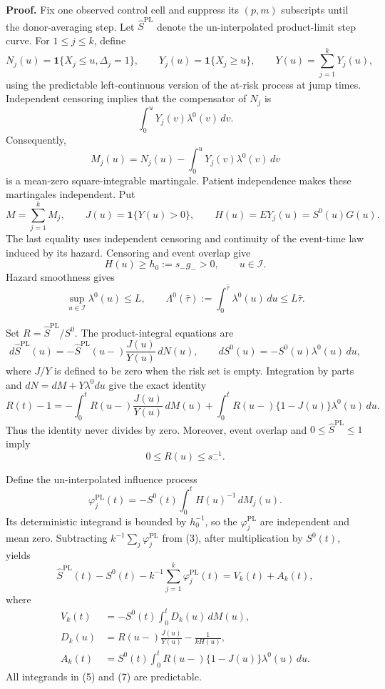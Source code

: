 \textbf{Proof.}
Fix one observed control cell and suppress its \((p,m)\) subscripts until the donor-averaging step.  Let \(\widehat S^{\mathrm{PL}}\) denote the un-interpolated product-limit step curve.  For \(1\le j\le k\), define
\[
 N_j(u)=\mathbf 1\{X_j\le u,\Delta_j=1\},\qquad
 Y_j(u)=\mathbf 1\{X_j\ge u\},\qquad
 Y(u)=\sum_{j=1}^kY_j(u),
\]
using the predictable left-continuous version of the at-risk process at jump times.  Independent censoring implies that the compensator of \(N_j\) is
\[
 \int_0^uY_j(v)\lambda^0(v)\,dv.
\]
Consequently,
\[
 M_j(u)=N_j(u)-\int_0^uY_j(v)\lambda^0(v)\,dv
\]
is a mean-zero square-integrable martingale.  Patient independence makes these martingales independent.  Put
\[
 M=\sum_{j=1}^kM_j,\qquad
 J(u)=\mathbf 1\{Y(u)>0\},\qquad
 H(u)=E Y_j(u)=S^0(u)G(u).
\]
The last equality uses independent censoring and continuity of the event-time law induced by its hazard.  Censoring and event overlap give
\[
 H(u)\ge h_0:=s_-g_->0,
 \qquad u\in\mathcal I.                                      \tag{1}
\]
Hazard smoothness gives
\[
 \sup_{u\in\mathcal I}\lambda^0(u)\le L,
 \qquad
 \Lambda^0(\bar\tau):=\int_0^{\bar\tau}\lambda^0(u)\,du
 \le L\bar\tau.                                               \tag{2}
\]

Set \(R=\widehat S^{\mathrm{PL}}/S^0\).  The product-integral equations are
\[
 d\widehat S^{\mathrm{PL}}(u)
 =-\widehat S^{\mathrm{PL}}(u-)\frac{J(u)}{Y(u)}\,dN(u),
 \qquad
 dS^0(u)=-S^0(u)\lambda^0(u)\,du,
\]
where \(J/Y\) is defined to be zero when the risk set is empty.  Integration by parts and \(dN=dM+Y\lambda^0du\) give the exact identity
\[
 R(t)-1
 =-\int_0^tR(u-)\frac{J(u)}{Y(u)}\,dM(u)
  +\int_0^tR(u-)\{1-J(u)\}\lambda^0(u)\,du.                 \tag{3}
\]
Thus the identity never divides by zero.  Moreover, event overlap and \(0\le\widehat S^{\mathrm{PL}}\le1\) imply
\[
 0\le R(u)\le s_-^{-1}.                                      \tag{4}
\]

Define the un-interpolated influence process
\[
 \varphi_j^{\mathrm{PL}}(t)
 =-S^0(t)\int_0^tH(u)^{-1}\,dM_j(u).                         \tag{5}
\]
Its deterministic integrand is bounded by \(h_0^{-1}\), so the \(\varphi_j^{\mathrm{PL}}\) are independent and mean zero.  Subtracting \(k^{-1}\sum_j\varphi_j^{\mathrm{PL}}\) from (3), after multiplication by \(S^0(t)\), yields
\[
 \widehat S^{\mathrm{PL}}(t)-S^0(t)
 -k^{-1}\sum_{j=1}^k\varphi_j^{\mathrm{PL}}(t)
 =V_k(t)+A_k(t),                                               \tag{6}
\]
where
\[
 \begin{aligned}
 V_k(t)&=-S^0(t)\int_0^tD_k(u)\,dM(u),\\
 D_k(u)&=R(u-)\frac{J(u)}{Y(u)}-\frac{1}{kH(u)},\\
 A_k(t)&=S^0(t)\int_0^tR(u-)\{1-J(u)\}\lambda^0(u)\,du.
 \end{aligned}                                                 \tag{7}
\]
All integrands in (5) and (7) are predictable.

